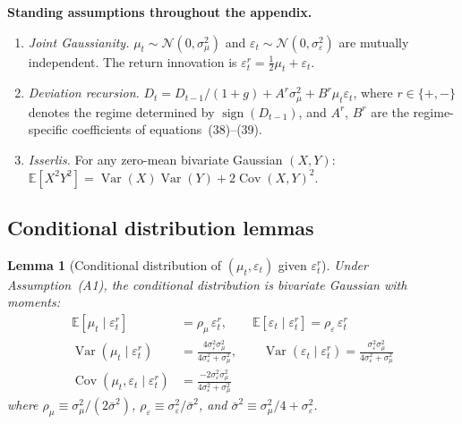\documentclass[12pt,a4paper]{article}
\newtheorem{lemma}[theorem]{Lemma}
\theoremstyle{definition}
\begin{document}
\medskip
\noindent\textbf{Standing assumptions throughout the appendix.}
\begin{enumerate}
  \item[(A1)] \textit{Joint Gaussianity.} $\mu_t \sim \mathcal{N}(0,
    \sigma^2_\mu)$ and $\varepsilon_t \sim \mathcal{N}(0,
    \sigma^2_\varepsilon)$ are mutually independent. The return
    innovation is $\varepsilon^r_t = \frac{1}{2}\mu_t +
    \varepsilon_t$.
  \item[(A2)] \textit{Deviation recursion.} $D_t = D_{t-1}/(1+g) +
    A^r\sigma^2_\mu + B^r\mu_t\varepsilon_t$, where $r \in \{+,-\}$
    denotes the regime determined by $\operatorname{sign}(D_{t-1})$,
    and $A^r$, $B^r$ are the regime-specific coefficients of
    equations~(38)--(39).
  \item[(A3)] \textit{Isserlis.} For any zero-mean bivariate Gaussian
    $(X,Y)$: $\mathbb{E}[X^2Y^2] = \operatorname{Var}(X)
    \operatorname{Var}(Y) + 2\operatorname{Cov}(X,Y)^2$.
\end{enumerate}

\subsection{Conditional distribution lemmas}

\begin{lemma}[Conditional distribution of $(\mu_t, \varepsilon_t)$
  given $\varepsilon^r_t$]
\label{lem:cond_dist}
Under Assumption~(A1), the conditional distribution is bivariate
Gaussian with moments:
\begin{align}
  \mathbb{E}[\mu_t \mid \varepsilon^r_t]
    &= \rho_\mu\,\varepsilon^r_t, \qquad
  \mathbb{E}[\varepsilon_t \mid \varepsilon^r_t]
    = \rho_\varepsilon\,\varepsilon^r_t
    \label{eq:cond_means} \\
  \operatorname{Var}(\mu_t \mid \varepsilon^r_t)
    &= \frac{4\sigma^2_\varepsilon\sigma^2_\mu}
       {4\sigma^2_\varepsilon + \sigma^2_\mu}, \qquad
  \operatorname{Var}(\varepsilon_t \mid \varepsilon^r_t)
    = \frac{\sigma^2_\varepsilon\sigma^2_\mu}
       {4\sigma^2_\varepsilon + \sigma^2_\mu}
    \label{eq:cond_vars} \\
  \operatorname{Cov}(\mu_t, \varepsilon_t \mid \varepsilon^r_t)
    &= \frac{-2\sigma^2_\varepsilon\sigma^2_\mu}
       {4\sigma^2_\varepsilon + \sigma^2_\mu}
    \label{eq:cond_cov}
\end{align}
where $\rho_\mu \equiv \sigma^2_\mu/(2\bar\sigma^2)$,
$\rho_\varepsilon \equiv \sigma^2_\varepsilon/\bar\sigma^2$, and
$\bar\sigma^2 \equiv \sigma^2_\mu/4 + \sigma^2_\varepsilon$.
\end{lemma}
\end{document}
